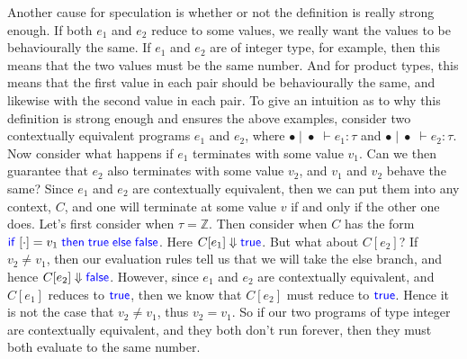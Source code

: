 \documentclass[twoside,11pt,openright]{report}
\theoremstyle{definition}
\newcommand{\Keyword}[1]{{\color{blue} \mathsf{#1}}}
\newcommand{\expr}{e}
\newcommand{\val}{v}
\newcommand{\True}{\Keyword{true}}
\newcommand{\False}{\Keyword{false}}
\newcommand{\IfCmd}{\Keyword{if}}
\newcommand{\ThenCmd}{\Keyword{then}}
\newcommand{\ElseCmd}{\Keyword{else}}
\def\If#1then#2else#3{\IfCmd{}\;#1\;\ThenCmd{}\;#2\;\ElseCmd{}\;#3}
\newcommand{\empctx}{[\cdot]}
\newcommand{\ctx}{C}
\newcommand{\Tint}{\mathbb{Z}}
\newcommand{\typ}{\tau}
\newcommand{\emptenv}{\bullet}
\newcommand{\empvenv}{\bullet}
\newcommand{\jdg}[4]{#1 \; | \; #2 \; \vdash #3 : #4}
\begin{document}
Another cause for speculation is whether or not the definition is really strong enough. If both $\expr_1$ and $\expr_2$ reduce to some values, we really want the values to be behaviourally the same.
If $\expr_1$ and $\expr_2$ are of integer type, for example, then this means that the two values must be the same number. And for product types, this means that the first value in each pair should be behaviourally the same, and likewise with the second value in each pair.
To give an intuition as to  why this definition is strong enough and ensures the above examples, consider two contextually equivalent programs $\expr_1$ and $\expr_2$, where $\jdg{\emptenv}{\empvenv}{\expr_1}{\typ}$ and $\jdg{\emptenv}{\empvenv}{\expr_2}{\typ}$.
Now consider what happens if $\expr_1$ terminates with some value $\val_1$. Can we then guarantee that $\expr_2$ also terminates with some value $\val_2$, and $\val_1$ and $\val_2$ behave the same? Since $\expr_1$ and $\expr_2$ are contextually equivalent, then we can put them into any context, $\ctx$, and one will terminate at some value $\val$ if and only if the other one does.
Let's first consider when $\typ = \Tint$. Then consider when $\ctx$ has the form $\If \empctx = \val_1 then \True else \False$. Here $\ctx[\expr_1] \Downarrow \True$. But what about $\ctx[\expr_2]$? If $\val_2 \neq \val_1$, then our evaluation rules tell us that we will take the else branch, and hence $\ctx[\expr_2] \Downarrow \False$. However, since $\expr_1$ and $\expr_2$ are contextually equivalent, and $\ctx[\expr_1]$ reduces to $\True$, then we know that $\ctx[\expr_2]$ must reduce to $\True$. Hence it is not the case that $\val_2 \neq \val_1$, thus $\val_2 = \val_1$. So if our two programs of type integer are contextually equivalent, and they both don't run forever, then they must both evaluate to the same number.
\end{document}

